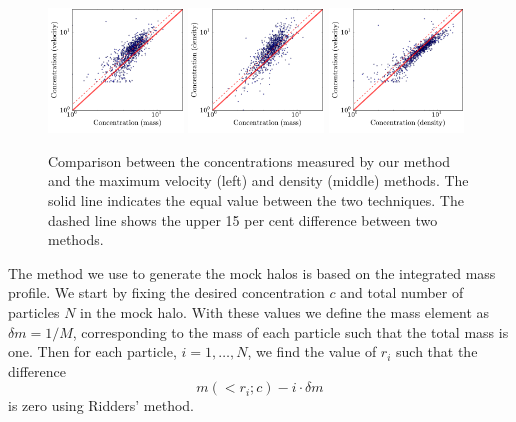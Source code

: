 \documentclass[a4,useAMS,usenatbib,usegraphicx]{mn2e}
\begin{document}
\label{sec:data}
\begin{figure}
  \begin{center}
    \includegraphics[width=0.32\textwidth]{conc_mass_vel.pdf}
    \includegraphics[width=0.32\textwidth]{conc_mass_dens.pdf}
    \includegraphics[width=0.32\textwidth]{conc_dens_vel.pdf}
  \end{center}
  \caption{Comparison between the concentrations measured by our
    method and the maximum velocity (left) and density (middle)
    methods. The solid line indicates the equal value between the two
    techniques. The dashed line shows the upper 15 per cent difference
    between two methods.
  \label{fig:comparison}}
\end{figure}



The method we use to generate the mock halos is based on the
integrated mass profile.  
We start by fixing the desired concentration $c$ and total number of
particles $N$ in the mock halo.  
With these values we define the mass element as $\delta m = 1/M$, corresponding
to the mass of each particle such that the total mass is one.   
Then for each particle, $i=1,\ldots,N$, we find the value of $r_i$
such that the difference 
% 
\begin{equation}
m(<r_i;c) - i \cdot \delta m
\end{equation}
%
is zero using Ridders' method.
\end{document}
